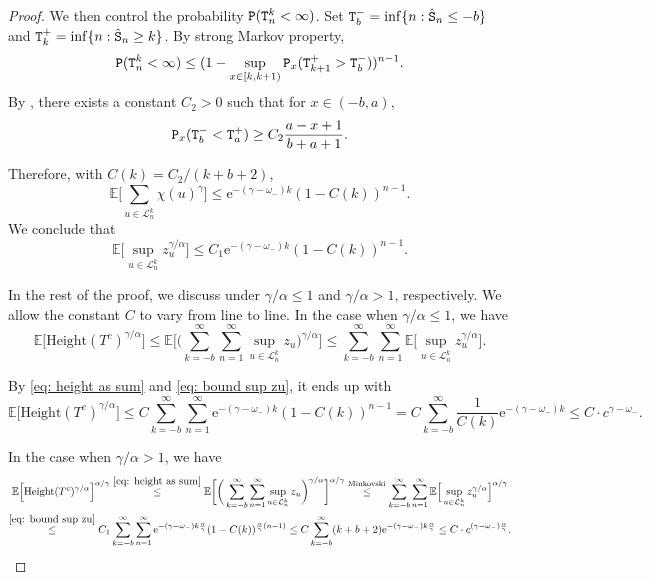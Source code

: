 \documentclass[12pt]{article}
\numberwithin{equation}{section}
\theoremstyle{plain}
\theoremstyle{definition}
\begin{document}
\begin{proof}
\noindent We then control the probability ${\tt P}({\tt T}^k_n < \infty)$. Set ${\tt T}^-_{b} = \inf\{n: {\hat{\tt S}}_n \leq -b\}$ and ${\tt T}^+_{k} = \inf\{n: {\hat{\tt S}}_n \geq k\}$. By strong Markov property,
\[{\tt P}({\tt T}^k_n < \infty) \leq (1- \sup_{x\in [k, k+1)}{\tt P}_x({\tt T}^+_{k+1} > {\tt T}^-_{b}))^{n-1}. \]
By \cite[Theorem 5.1.7]{LawlerGregoryF.2010RWAM}, there exists a constant $C_2 > 0$ such that for $x\in (-b, a)$,
\[{\tt P}_x({\tt T}_b^- < {\tt T}_a^+) \geq C_2\frac{a-x+1}{b+a+1}.\]

\noindent Therefore, with $C(k) = C_2/(k+b+2)$,
\begin{equation}\label{eq: sum L k n}
\mathbb{E}\bigg[\sum_{u\in\mathcal{L}^k_n} \chi(u)^{\gamma}\bigg] \leq \mathrm{e}^{-(\gamma-\omega_-)k}(1-C(k))^{n-1}.
\end{equation}
We conclude that
\begin{equation}\label{eq: bound sup zu}
\mathbb{E}\bigg[\sup_{u\in\mathcal{L}^k_n} z_u^{\gamma/\alpha}\bigg]\leq C_1 \mathrm{e}^{-(\gamma-\omega_-)k}(1-C(k))^{n-1}.
\end{equation}

In the rest of the proof, we discuss under $\gamma/\alpha\leq 1$ and $\gamma/\alpha > 1$, respectively. We allow the constant $C$ to vary from line to line. In the case when $\gamma/\alpha\leq 1$, we have
\[\mathbb{E}\Big[\mathrm{Height}(T^c)^{\gamma/\alpha}\Big] \leq \mathbb{E}\bigg[\bigg(\sum^{\infty}_{k=-b}\sum^{\infty}_{n=1} \sup_{u\in\mathcal{L}^k_n} z_u\bigg)^{\gamma/\alpha}\bigg]\leq \sum^{\infty}_{k=-b}\sum^{\infty}_{n=1} \mathbb{E}\bigg[\sup_{u\in\mathcal{L}^k_n} z_u^{\gamma/\alpha}\bigg]. \]

\noindent By \eqref{eq: height as sum} and \eqref{eq: bound sup zu}, it ends up with
\[\mathbb{E}\Big[\mathrm{Height}(T^c)^{\gamma/\alpha}\Big] \leq C\sum^{\infty}_{k=-b}\sum^{\infty}_{n=1} \mathrm{e}^{-(\gamma-\omega_-)k}(1-C(k))^{n-1} = C\sum^{\infty}_{k=-b}\frac{1}{C(k)}\mathrm{e}^{-(\gamma-\omega_-)k} \leq C\cdot c^{\gamma-\omega_-}.\]

\noindent In the case when $\gamma/\alpha > 1$, we have
\begin{multline*}
\mathbb{E}\Big[\mathrm{Height}(T^c)^{\gamma/\alpha}\Big]^{\alpha/\gamma} \stackrel{\eqref{eq: height as sum}}{\leq} \mathbb{E}\bigg[\bigg(\sum^{\infty}_{k=-b}\sum^{\infty}_{n=1} \sup_{u\in\mathcal{L}^k_n} z_u\bigg)^{\gamma/\alpha}\bigg]^{\alpha/\gamma}
\stackrel{\mathrm{Minkovski}}{\leq} \sum^{\infty}_{k=-b}\sum^{\infty}_{n=1} \mathbb{E}\Big[\sup_{u\in\mathcal{L}^k_n} z_u^{\gamma/\alpha}\Big]^{\alpha/\gamma}\\
\stackrel{\eqref{eq: bound sup zu}}{\leq} C_1\sum^{\infty}_{k=-b}\sum^{\infty}_{n=1} \mathrm{e}^{-(\gamma-\omega_-)k\frac{\alpha}{\gamma}}(1-C(k))^{\frac{\alpha}{\gamma}(n-1)}
\leq  C\sum^{\infty}_{k=-b} (k+b+2)\mathrm{e}^{-(\gamma-\omega_-)k\frac{\alpha}{\gamma}} \leq C\cdot c^{(\gamma-\omega_-)\frac{\alpha}{\gamma}}.
\end{multline*}

\end{proof}
\end{document}
